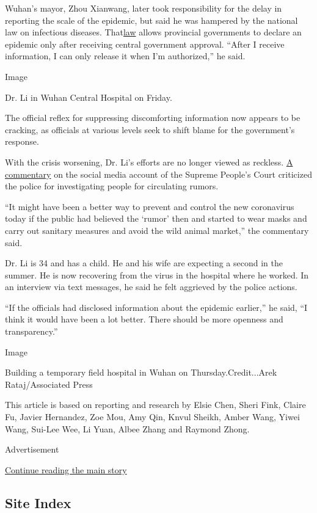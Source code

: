 Wuhan's mayor, Zhou Xianwang, later took responsibility for the delay in
reporting the scale of the epidemic, but said he was hampered by the
national law on infectious diseases.
That\href{http://en.pkulaw.cn/display.aspx?cgid=221cc4a42d25144cbdfb\&lib=law}{law}
allows provincial governments to declare an epidemic only after
receiving central government approval. ``After I receive information, I
can only release it when I'm authorized,'' he said.

Image

Dr. Li in Wuhan Central Hospital on Friday.

The official reflex for suppressing discomforting information now
appears to be cracking, as officials at various levels seek to shift
blame for the government's response.

With the crisis worsening, Dr. Li's efforts are no longer viewed as
reckless. \href{https://mp.weixin.qq.com/s/ETgXN6HInzlC8cxzhDdU9g}{A
commentary} on the social media account of the Supreme People's Court
criticized the police for investigating people for circulating rumors.

``It might have been a better way to prevent and control the new
coronavirus today if the public had believed the `rumor' then and
started to wear masks and carry out sanitary measures and avoid the wild
animal market,'' the commentary said.

Dr. Li is 34 and has a child. He and his wife are expecting a second in
the summer. He is now recovering from the virus in the hospital where he
worked. In an interview via text messages, he said he felt aggrieved by
the police actions.

``If the officials had disclosed information about the epidemic
earlier,'' he said, ``I think it would have been a lot better. There
should be more openness and transparency.''

Image

Building a temporary field hospital in Wuhan on Thursday.Credit...Arek
Rataj/Associated Press

This article is based on reporting and research by Elsie Chen, Sheri
Fink, Claire Fu, Javier Hernandez, Zoe Mou, Amy Qin, Knvul Sheikh, Amber
Wang, Yiwei Wang, Sui-Lee Wee, Li Yuan, Albee Zhang and Raymond Zhong.

Advertisement

\protect\hyperlink{after-bottom}{Continue reading the main story}

\hypertarget{site-index}{%
\subsection{Site Index}\label{site-index}}


